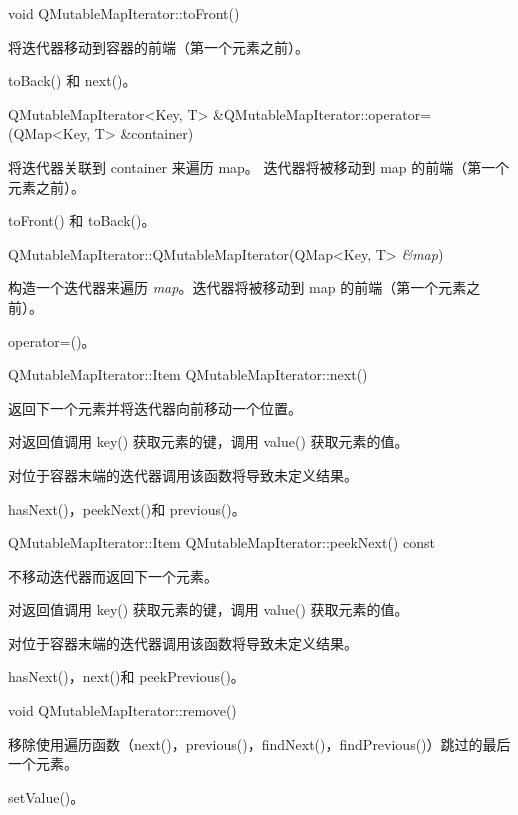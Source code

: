 void QMutableMapIterator::toFront()

将迭代器移动到容器的前端（第一个元素之前）。

\begin{seeAlso}
toBack() 和 next()。
\end{seeAlso}

QMutableMapIterator<Key, T> \&QMutableMapIterator::operator=(QMap<Key, T> \&container)

将迭代器关联到 container 来遍历 map。
迭代器将被移动到 map 的前端（第一个元素之前）。

\begin{seeAlso}
toFront() 和 toBack()。
\end{seeAlso}

QMutableMapIterator::QMutableMapIterator(QMap<Key, T> \emph{\&map})

构造一个迭代器来遍历 \emph{map}。迭代器将被移动到 map 的前端（第一个元素之前）。

\begin{seeAlso}
operator=()。
\end{seeAlso}

QMutableMapIterator::Item QMutableMapIterator::next()

返回下一个元素并将迭代器向前移动一个位置。

对返回值调用 key() 获取元素的键，调用 value() 获取元素的值。

对位于容器末端的迭代器调用该函数将导致未定义结果。

\begin{seeAlso}
hasNext()，peekNext()和 previous()。
\end{seeAlso}

QMutableMapIterator::Item QMutableMapIterator::peekNext() const

不移动迭代器而返回下一个元素。

对返回值调用 key() 获取元素的键，调用 value() 获取元素的值。

对位于容器末端的迭代器调用该函数将导致未定义结果。

\begin{seeAlso}
hasNext()，next()和 peekPrevious()。
\end{seeAlso}

void QMutableMapIterator::remove()

移除使用遍历函数（next()，previous()，findNext()，findPrevious()）跳过的最后一个元素。

\begin{seeAlso}
setValue()。
\end{seeAlso}

